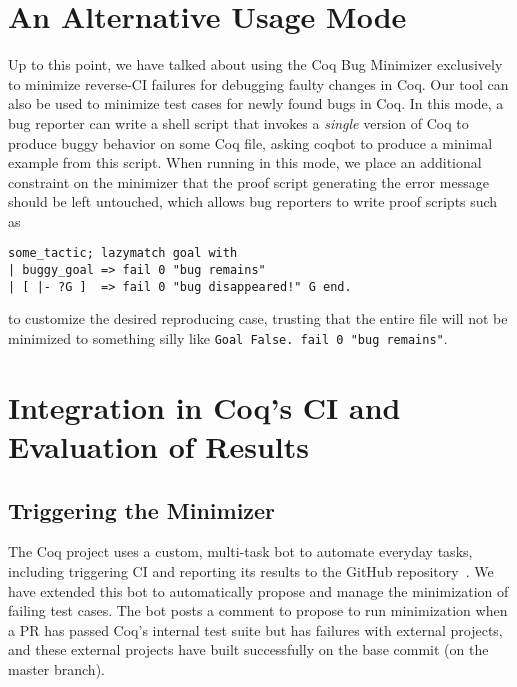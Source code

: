 \documentclass[a4paper,USenglish,cleveref,autoref,thm-restate]{lipics-v2021}
\makeatletter
\newcommand{\todo}[1]{%
\@latex@warning{TODO: \detokenize{#1} on page \thepage}%
\textcolor{red}{[\textbf{TODO:} #1]}}%
\makeatother
\begin{document}



\section{An Alternative Usage Mode}\label{sec:alt-usage}

Up to this point, we have talked about using the Coq Bug Minimizer exclusively to minimize reverse-CI failures for debugging faulty changes in Coq.
Our tool can also be used to minimize test cases for newly found bugs in Coq.
In this mode, a bug reporter can write a shell script that invokes a \emph{single} version of Coq to produce buggy behavior on some Coq file, asking coqbot to produce a minimal example from this script.
When running in this mode, we place an additional constraint on the minimizer that the proof script generating the error message should be left untouched,
which allows bug reporters to write proof scripts such as
\begin{verbatim}
some_tactic; lazymatch goal with
| buggy_goal => fail 0 "bug remains"
| [ |- ?G ]  => fail 0 "bug disappeared!" G end.
\end{verbatim}
to customize the desired reproducing case, trusting that the entire file will not be minimized to something silly like \verb|Goal False. fail 0 "bug remains"|.





\section{Integration in Coq's CI and Evaluation of Results}\label{sec:evaluation}

\subsection{Triggering the Minimizer}

The Coq project uses a custom, multi-task bot to automate everyday tasks, including triggering CI and reporting its results to the GitHub repository~\cite{zimmermann:hal-03479327}. We have extended this bot to automatically propose and manage the minimization of failing test cases. The bot posts a comment to propose to run minimization when a PR has passed Coq's internal test suite but has failures with external projects, and these external projects have built successfully on the base commit (on the master branch).
\end{document}
